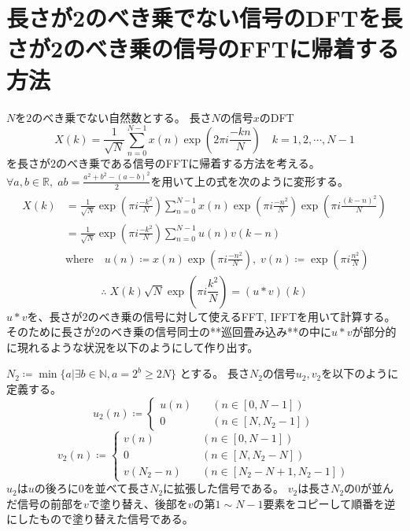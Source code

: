 		\section{長さが2のべき乗でない信号のDFTを長さが2のべき乗の信号のFFTに帰着する方法}
			$N$を$2$のべき乗でない自然数とする。
			長さ$N$の信号$x$のDFT
			\[ X(k) = \frac{1}{\sqrt{N}} \sum_{n=0}^{N-1} x(n)\exp \left(2\pi i\frac{-kn}{N}\right) \quad k=1,2,\cdots,N-1 \]
			を長さが$2$のべき乗である信号のFFTに帰着する方法を考える。
			$\forall a,b\in\mathbb{R},\;ab = \frac{a^2 + b^2 - (a-b)^2}{2}$を用いて上の式を次のように変形する。
			\begin{align*}
				\begin{aligned}
					X(k) &= \frac{1}{\sqrt{N}} \exp \left(\pi i\frac{-k^2}{N}\right) \sum_{n=0}^{N-1} x(n)\exp \left(\pi i\frac{-n^2}{N}\right) \exp \left(\pi i\frac{(k-n)^2}{N}\right) \\
					&= \frac{1}{\sqrt{N}} \exp \left(\pi i\frac{-k^2}{N}\right) \sum_{n=0}^{N-1} u(n)v(k-n) \\
					& \text{where} \quad u(n) \coloneqq x(n)\exp \left(\pi i\frac{-n^2}{N}\right),\;v(n) \coloneqq \exp \left(\pi i\frac{n^2}{N}\right)
				\end{aligned}
			\end{align*}
			\[ \therefore\; X(k)\sqrt{N} \exp \left(\pi i\frac{k^2}{N}\right) = (u*v)(k) \]
			$u*v$を、長さが$2$のべき乗の信号に対して使えるFFT, IFFTを用いて計算する。
			そのために長さが$2$のべき乗の信号同士の**巡回畳み込み**の中に$u*v$が部分的に現れるような状況を以下のようにして作り出す。
			\par
			$N_2 \coloneqq \min\{a|\exists b\in \mathbb{N}, a = 2^b \geq 2N\}$ とする。
			長さ$N_2$の信号$u_2,v_2$を以下のように定義する。
			\[
				u_2(n) \coloneqq \left\{
					\begin{aligned}
						u(n) &\quad (n \in [0,N-1]) \\
						0 &\quad (n \in [N,N_2-1])
					\end{aligned}
				\right.
			\]
			\[
				v_2(n) \coloneqq \left\{
					\begin{aligned}
						v(n) &\quad (n \in [0,N-1]) \\
						0 &\quad (n\in [N,N_2-N]) \\
						v(N_2-n) &\quad (n \in [N_2-N+1,N_2-1])
					\end{aligned}
				\right.
			\]
			$u_2$は$u$の後ろに$0$を並べて長さ$N_2$に拡張した信号である。
			$v_2$は長さ$N_2$の$0$が並んだ信号の前部を$v$で塗り替え、後部を$v$の第$1\sim N-1$要素をコピーして順番を逆にしたもので塗り替えた信号である。
